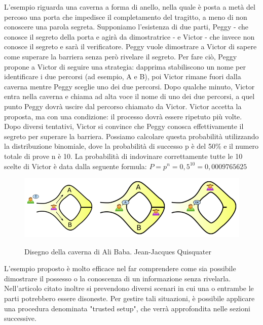 L’esempio riguarda una caverna a forma di anello, nella quale è posta a metà del percoso una porta che impedisce il
completamento del tragitto, a meno di non conoscere una parola segreta. Supponiamo l'esistenza di due parti, Peggy - che
conosce il segreto della porta e agirà da dimostratrice - e Victor - che invece non conosce il segreto e sarà il
verificatore. Peggy vuole dimostrare a Victor di sapere come superare la barriera senza però rivelare il segreto. Per
fare ciò, Peggy propone a Victor di seguire una strategia: dapprima stabiliscono un nome per identificare i due percorsi
(ad esempio, A e B), poi Victor rimane fuori dalla caverna mentre Peggy sceglie uno dei due percorsi. Dopo qualche
minuto, Victor entra nella caverna e chiama ad alta voce il nome di uno dei due percorsi, a quel punto Peggy dovrà
uscire dal percorso chiamato da Victor. Victor accetta la proposta, ma con una condizione: il processo dovrà essere
ripetuto più volte. Dopo diversi tentativi, Victor si convince che Peggy conosca effettivamente il segreto per superare
la barriera. Possiamo calcolare questa probabilità utilizzando la distribuzione binomiale, dove la probabilità di
successo p è del 50\% e il numero totale di prove n è 10. La probabilità di indovinare correttamente tutte le 10 scelte
di Victor è data dalla seguente formula: \(P = p^n = 0,5^{10} = 0,0009765625\)
\begin{figure}[H]
    \centering
    \includegraphics[width=13cm]{./chapters/1.state-of-art/images/5.alibaba-cave.png}
    \label{fig:alibaba-cave}
    \captionsetup{justification=centering}
    \caption{Disegno della caverna di Ali Baba. Jean-Jacques Quisquater}
\end{figure}

L'esempio proposto è molto efficace nel far comprendere come sia possibile dimostrare il possesso o la conoscenza di un
informazione senza rivelarla. Nell’articolo citato inoltre si prevendono diversi scenari in cui una o entrambe le parti
potrebbero essere disoneste. Per gestire tali situazioni, è possibile applicare una procedura denominata "trusted
setup", che verrà approfondita nelle sezioni successive.

